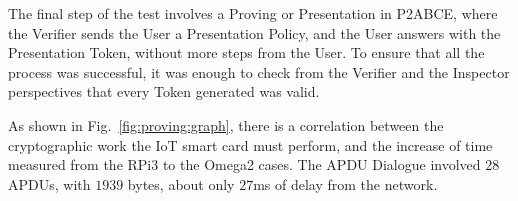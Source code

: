 \hfil

The final step of the test involves a Proving or Presentation in P2ABCE, where the Verifier sends the User a Presentation Policy, and the User answers with the Presentation Token, without more steps from the User. To ensure that all the process was successful, it was enough to check from the Verifier and the Inspector perspectives that every Token generated was valid.


As shown in Fig.~\ref{fig:proving:graph}, there is a correlation between the cryptographic work the IoT smart card must perform, and the increase of time measured from the RPi3 to the Omega2 cases. 
The APDU Dialogue involved $28$ APDUs, with $1939$ bytes, about only $27$ms of delay from the network.



